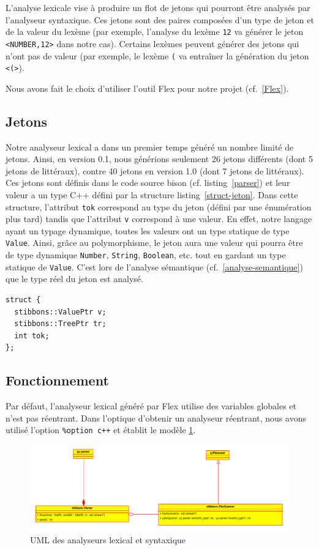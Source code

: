 L'analyse lexicale vise à produire un flot de jetons qui pourront être analysés par l'analyseur syntaxique. Ces jetons sont des paires composées d'un type de jeton et de la valeur du lexème (par exemple, l'analyse du lexème \verb|12| va générer le jeton \verb|<NUMBER,12>| dans notre cas). Certains lexèmes peuvent générer des jetons qui n'ont pas de valeur (par exemple, le lexème \verb|(| va entraîner la génération du jeton \verb|<(>|).

Nous avons fait le choix d'utiliser l'outil Flex pour notre projet (cf.~\ref{Flex}).

\subsection{Jetons}
Notre analyseur lexical a dans un premier temps généré un nombre limité de jetons. Ainsi, en version 0.1, nous générions seulement 26 jetons différents (dont 5 jetons de littéraux), contre 40 jetons en version 1.0 (dont 7 jetons de littéraux). Ces jetons sont définis dans le code source bison (cf. listing~\ref{parser}) et leur valeur a un type C++ défini par la structure listing~\ref{struct-jeton}. Dans cette structure, l'attribut \verb|tok| correspond au type du jeton (défini par une énumération plus tard) tandis que l'attribut \verb|v| correspond à une valeur. En effet, notre langage ayant un typage dynamique, toutes les valeurs ont un type statique de type \verb|Value|. Ainsi, grâce au polymorphisme, le jeton aura une valeur qui pourra être de type dynamique \verb|Number|, \verb|String|, \verb|Boolean|, etc. tout en gardant un type statique de \verb|Value|. C'est lors de l'analyse sémantique (cf.~\ref{analyse-semantique}) que le type réel du jeton est analysé.

\begin{lstlisting}[label=struct-jeton,caption=Type des valeurs des jetons]
struct {
  stibbons::ValuePtr v;
  stibbons::TreePtr tr;
  int tok;
};
\end{lstlisting}

\subsection{Fonctionnement}
Par défaut, l'analyseur lexical généré par Flex utilise des variables globales et n'est pas réentrant. Dans l'optique d'obtenir un analyseur réentrant, nous avons utilisé l'option \verb|%option c++| et établit le modèle \ref{uml-lexer}.

\begin{figure}[h]
\centering
\includegraphics[scale=0.6]{doc/report/img/reentrant-parser}
\caption{\label{uml-lexer} UML des analyseurs lexical et syntaxique}
\end{figure}

